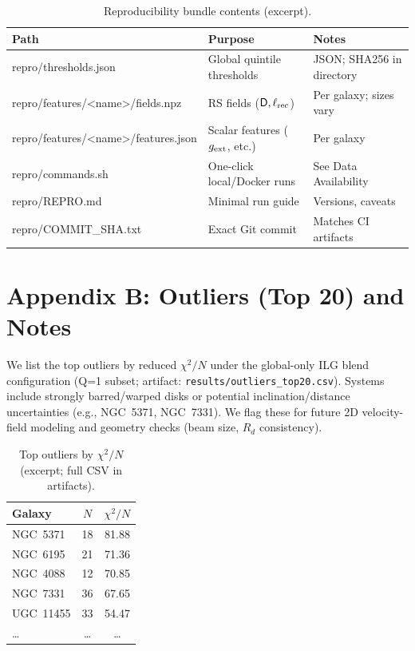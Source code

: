 \documentclass[fleqn,usenatbib]{mnras}
\begin{document}
\begin{table}[h]
\centering
\caption{Reproducibility bundle contents (excerpt).}
\label{tab:repro_bundle}
\begin{tabular}{l l l}
\toprule
Path & Purpose & Notes \\
\midrule
repro/thresholds.json & Global quintile thresholds & JSON; SHA256 in directory \\
repro/features/<name>/fields.npz & RS fields ($\mathsf D,\ell_{\rm rec}$) & Per galaxy; sizes vary \\
repro/features/<name>/features.json & Scalar features ($g_{\rm ext}$, etc.) & Per galaxy \\
repro/commands.sh & One-click local/Docker runs & See Data Availability \\
repro/REPRO.md & Minimal run guide & Versions, caveats \\
repro/COMMIT\_SHA.txt & Exact Git commit & Matches CI artifacts \\
\bottomrule
\end{tabular}
\end{table}

\section*{Appendix B: Outliers (Top 20) and Notes}
\noindent We list the top outliers by reduced $\chi^2/N$ under the global-only ILG blend configuration (Q=1 subset; artifact: \texttt{results/outliers\_top20.csv}). Systems include strongly barred/warped disks or potential inclination/distance uncertainties (e.g., NGC~5371, NGC~7331). We flag these for future 2D velocity-field modeling and geometry checks (beam size, $R_d$ consistency).

\begin{table}[h]
\centering
\caption{Top outliers by $\chi^2/N$ (excerpt; full CSV in artifacts).}
\label{tab:outliers_top20}
\begin{tabular}{lcc}
\toprule
Galaxy & $N$ & $\chi^2/N$ \\
\midrule
NGC~5371 & 18 & 81.88 \\
NGC~6195 & 21 & 71.36 \\
NGC~4088 & 12 & 70.85 \\
NGC~7331 & 36 & 67.65 \\
UGC~11455 & 33 & 54.47 \\
\dots & \dots & \dots \\
\bottomrule
\end{tabular}
\end{table}
\end{document}
